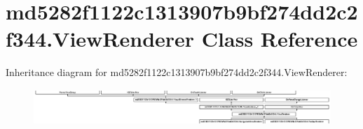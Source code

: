 \hypertarget{classmd5282f1122c1313907b9bf274dd2c2f344_1_1ViewRenderer}{}\section{md5282f1122c1313907b9bf274dd2c2f344.\+View\+Renderer Class Reference}
\label{classmd5282f1122c1313907b9bf274dd2c2f344_1_1ViewRenderer}
Inheritance diagram for md5282f1122c1313907b9bf274dd2c2f344.\+View\+Renderer\+:\begin{figure}[H]
\begin{center}
\leavevmode
\includegraphics[height=1.372549cm]{classmd5282f1122c1313907b9bf274dd2c2f344_1_1ViewRenderer}
\end{center}
\end{figure}
